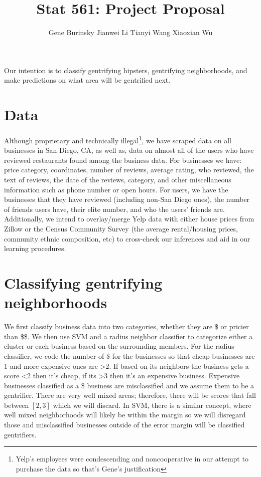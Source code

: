 \documentclass[11pt,a4paper]{article}
\author{Gene Burinsky Jianwei Li Tianyi Wang Xiaoxian Wu}
\title{Stat 561: Project Proposal}
\begin{document}
	\maketitle
	
	Our intention is to classify gentrifying hipsters, gentrifying neighborhoods, and make predictions on what area will be gentrified next. 
	\section{Data}
	Although proprietary and technically illegal\footnote{Yelp's employees were condescending and noncooperative in our attempt to purchase the data so that's Gene's justification}, we have scraped data on all businesses in San Diego, CA, as well as, data on almost all of the users who have reviewed restaurants found among the business data. For businesses we have: price category, coordinates, number of reviews, average rating, who reviewed, the text of reviews, the date of the reviews, category, and other miscellaneous information such as phone number or open hours. For users, we have the businesses that they have reviewed (including non-San Diego ones), the number of friends users have, their elite number, and who the users' friends are. Additionally, we intend to overlay/merge Yelp data with either house prices from Zillow or the Census Community Survey (the average rental/housing prices, community ethnic composition, etc) to cross-check our inferences and aid in our learning procedures. 
	
	
	\section{Classifying gentrifying neighborhoods}
	We first classify business data into two categories, whether they are \$ or pricier than \$\$. We then use SVM and a radius neighbor classifier to categorize either a cluster or each business based on the surrounding members. For the radius classifier, we code the number of \$ for the businesses so that cheap businesses are 1 and more expensive ones are >2. If based on its neighbors the business gets a score <2 then it's cheap, if its >3 then it's an expensive business. Expensive businesses classified as a \$ business are misclassified and we assume them to be a gentrifier. There are very well mixed areas; therefore, there will be scores that fall between $[2,3]$ which we will discard. In SVM, there is a similar concept, where well mixed neighborhoods will likely be within the margin so we will disregard those and misclassified businesses outside of the error margin will be classified gentrifiers. 
	
\end{document}
